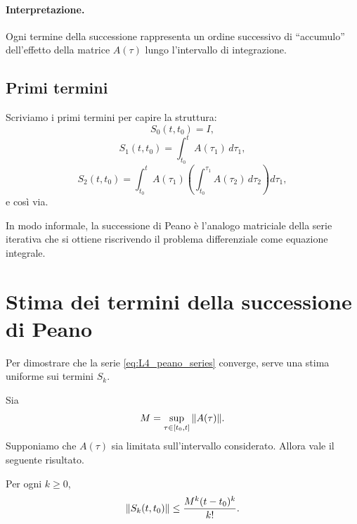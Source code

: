 \paragraph{Interpretazione.}
Ogni termine della successione rappresenta un ordine successivo di ``accumulo'' dell'effetto della matrice $A(\tau)$ lungo l'intervallo di integrazione.

\subsection{Primi termini}

Scriviamo i primi termini per capire la struttura:
\[
S_0(t,t_0)=I,
\]
\[
S_1(t,t_0)=\int_{t_0}^{t}A(\tau_1)\,d\tau_1,
\]
\[
S_2(t,t_0)=\int_{t_0}^{t}A(\tau_1)\left(\int_{t_0}^{\tau_1}A(\tau_2)\,d\tau_2\right)d\tau_1,
\]
e così via.

In modo informale, la successione di Peano è l'analogo matriciale della serie iterativa che si ottiene riscrivendo il problema differenziale come equazione integrale.

\section{Stima dei termini della successione di Peano}

Per dimostrare che la serie \eqref{eq:L4_peano_series} converge, serve una stima uniforme sui termini $S_k$.

Sia
\[
M=\sup_{\tau\in[t_0,t]}\norm{A(\tau)}.
\]
Supponiamo che $A(\tau)$ sia limitata sull'intervallo considerato. Allora vale il seguente risultato.

\begin{proposizione}
Per ogni $k\ge 0$,
\begin{equation}
\norm{S_k(t,t_0)}\le \frac{M^k(t-t_0)^k}{k!}.
\label{eq:L4_bound_Sk}
\end{equation}
\end{proposizione}

